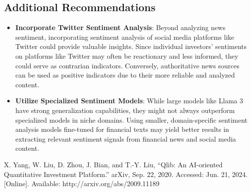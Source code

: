 \documentclass[conference]{IEEEtran}
\begin{document}
\subsection{\textbf{Additional Recommendations}}

\begin{itemize}
    \item \textbf{Incorporate Twitter Sentiment Analysis}: Beyond analyzing news sentiment, incorporating sentiment analysis of social media platforms like Twitter could provide valuable insights. Since individual investors' sentiments on platforms like Twitter may often be reactionary and less informed, they could serve as contrarian indicators. Conversely, authoritative news sources can be used as positive indicators due to their more reliable and analyzed content.
    \item \textbf{Utilize Specialized Sentiment Models}: While large models like Llama 3 have strong generalization capabilities, they might not always outperform specialized models in niche domains. Using smaller, domain-specific sentiment analysis models fine-tuned for financial texts may yield better results in extracting relevant sentiment signals from financial news and social media content.
\end{itemize}

\begin{thebibliography}{00}
 X. Yang, W. Liu, D. Zhou, J. Bian, and T.-Y. Liu, “Qlib: An AI-oriented Quantitative Investment Platform.” arXiv, Sep. 22, 2020. Accessed: Jun. 21, 2024. [Online]. Available: http://arxiv.org/abs/2009.11189
\end{thebibliography}
\end{document}
